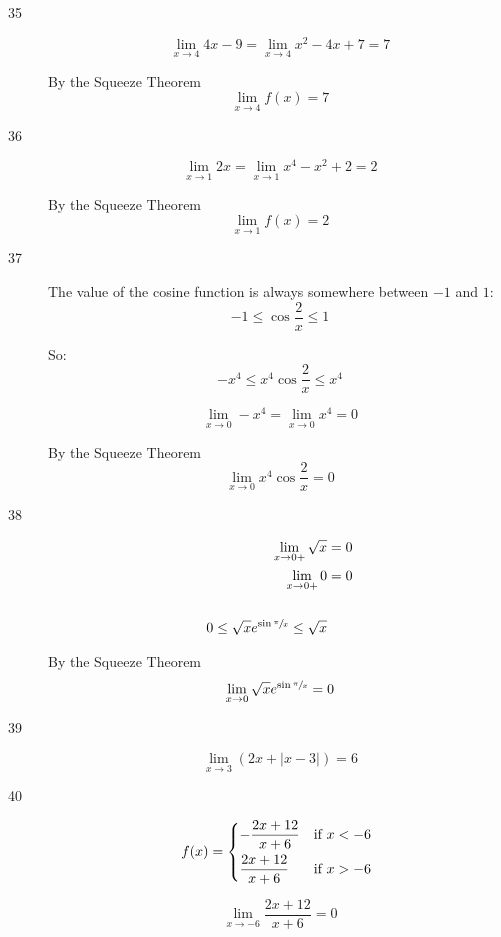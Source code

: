 \documentclass[letterpaper]{exam}
\begin{document}
\begin{description}
      \item[35]
        \[
          \lim_{x \to 4} 4x - 9 = \lim_{x \to 4} x^2 - 4x + 7 = 7
        \]

        By the Squeeze Theorem
        \[
          \lim_{x \to 4} f(x) = 7
        \]

      \item[36]
        \[
          \lim_{x \to 1} 2x = \lim_{x \to 1} x^4 - x^2 + 2 = 2
        \]

        By the Squeeze Theorem
        \[
          \lim_{x \to 1} f(x) = 2
        \]

      \item[37]
        The value of the cosine function is always somewhere between $-1$ and
        $1$:
        \[
          -1 \leq \cos \frac{2}{x} \leq 1
        \]

        So:
        \[
          -x^4 \leq x^4 \cos \frac{2}{x} \leq x^4
        \]

        \[
          \lim_{x \to 0} -x^4 = \lim_{x \to 0} x^4 = 0
        \]

        By the Squeeze Theorem
        \[
          \lim_{x \to 0} x^4 \cos \frac{2}{x} = 0
        \]

      \item[38]
        \begin{align*}
          \lim_{x \to 0+} \sqrt{x} &= 0 \\
          \lim_{x \to 0+} 0 &= 0 \\
          \\
          0 \leq \sqrt{x} e^{\sin \sfrac{\pi}{x}} \leq \sqrt{x}
        \end{align*}


        By the Squeeze Theorem
        \[
          \lim_{x \to 0} \sqrt{x} e^{\sin \sfrac{\pi}{x}} = 0
        \]

      \item[39] 
        \[
          \lim_{x \to 3} (2x + |x - 3|) = 6 
        \]

      \item[40]
        \[
          f(x) = 
            \begin{dcases*}
              - \frac{2x + 12}{x + 6} & if $x < -6$ \\
              \frac{2x + 12}{x + 6}   & if $x > -6$ \\
            \end{dcases*}
        \]

        \[
          \lim_{x \to -6} \frac{2x + 12}{x + 6} = 0
        \]


\end{description}
\end{document}
